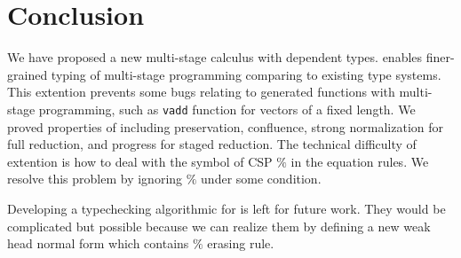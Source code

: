 
\section{Conclusion \label{sec:conclusion}}

We have proposed a new multi-stage calculus \LMD with dependent types.
\LMD enables finer-grained typing of multi-stage programming comparing to existing type systems.
This extention prevents some bugs relating to generated functions with multi-stage programming,
such as \verb|vadd| function for vectors of a fixed length.
We proved properties of \LMD including preservation, confluence, 
strong normalization for full reduction, and progress for staged reduction.
The technical difficulty of extention is how to deal with the symbol of CSP $\%$ in the equation rules.
We resolve this problem by ignoring $\%$ under some condition.

Developing a typechecking algorithmic for \LMD is left for future work.
They would be complicated but possible 
because we can realize them by defining a new weak head normal form which contains $\%$ erasing rule.